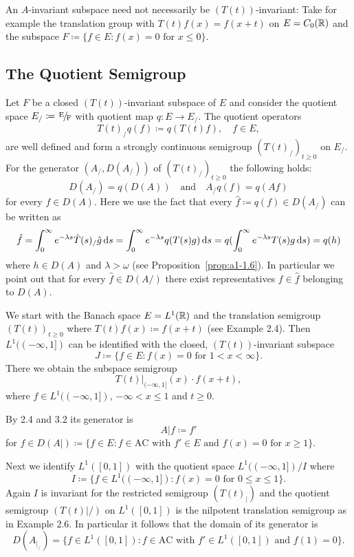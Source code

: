 An $A$-invariant subspace need not necessarily be $(T(t))$-invariant:
Take for example the translation group with $T(t)f(x) = f(x+t)$ on $E = C_{0}(\mathbb{R})$ and the subspace $F \coloneqq \{f \in E \colon f(x) = 0 \text{ for } x \leq 0\}$.
\subsection{The Quotient Semigroup}\label{subsec:a1-3.4}
Let $F$ be a closed $(T(t))$-invariant subspace of $E$ and consider the quotient space $ E_{/}\coloneqq \sfrac{E}{F} $ with quotient map $q \colon E \to E_{/}$. 
The quotient operators
\[
    T(t)_{/}q(f) \coloneqq q(T(t)f), \quad f \in E,
\]
are well defined and form a strongly continuous semigroup $(T(t)_{/})_{t \geq 0}$ on $E_{/}$.
For the generator $(A_{/},D(A_{/}))$ of $(T(t)_{/})_{t \geq 0}$ the following holds:
\[
    D(A_{/}) = q(D(A)) 
    \quad \text{and} \quad 
    A_{/}q(f) = q(Af)
\]
for every $f \in D(A)$.
Here we use the fact that every $\hat{f} \coloneqq q(f) \in D(A_{/})$ can be written as
\[
    \hat{f} = \int_{0}^{\infty} e^{-\lambda s} \hat{T}(s)_{/}\hat{g} \mathop{}\!\mathrm{d}{s} 
    = \int_{0}^{\infty} e^{-\lambda s}q(T(s)g) \mathop{}\!\mathrm{d}{s} 
    = q(\int_{0}^{\infty} e^{-\lambda s}T(s)g \mathop{}\!\mathrm{d}{s}) = q(h)
\]
where $h \in D(A)$ and $\lambda > \omega$ (see Proposition~\ref{prop:a1-1.6}).
In particular we point out that for every $\hat{f} \in D(A/)$ there exist representatives $f \in \hat{f}$ belonging to $D(A)$.
\begin{example*}\label{ex:a1-3.1}
We start with the Banach space $E = L^{1}(\mathbb{R})$ and the translation semigroup $(T(t))_{t \geq 0}$ where $T(t)f(x) \coloneqq f(x+t)$ (see Example 2.4).
Then $L^{1}((-\infty,1])$ can be identified with the closed, $(T(t))$-invariant subspace
\[
    J \coloneqq \{f \in E \colon f(x) = 0 \text{ for } 1 < x < \infty\} .
\]
There we obtain the subspace semigroup
\[
    T(t)|_{(-\infty,1]}(x) \cdot f(x+t),
\]
where $f \in L^{1}((-\infty,1])$, $-\infty < x \leq 1$ and $t \geq 0$.

By 2.4 and 3.2 its generator is
\[
    A|f \coloneqq f'
\]
for $f \in D(A|) \coloneqq \{f \in E \colon f \in \text{AC} \text{ with } f' \in E \text{ and } f(x) = 0 \text{ for } x \geq 1\}$.

Next we identify $L^{1}(\left[ 0,1 \right])$ with the quotient space $L^{1}((-\infty,1])/I$ where
\[
    I \coloneqq \{f \in L^{1}((-\infty,1]) \colon f(x) = 0 \text{ for } 0 \leq x \leq 1\} .
\]
Again $I$ is invariant for the restricted semigroup $(T(t)_{|})$ and the
quotient semigroup $(T(t)|/)$ on $L^{1}(\left[ 0,1 \right])$ is the nilpotent translation semigroup as in Example 2.6.
In particular it follows that the domain of its generator is
\[
    D(A_{|_{/}}) = \{f \in L^{1}(\left[ 0,1 \right]) \colon f \in \text{AC} \text{ with } f' \in L^{1}(\left[ 0,1 \right]) \text{ and } f(1) = 0\}.
\]
\end{example*}
